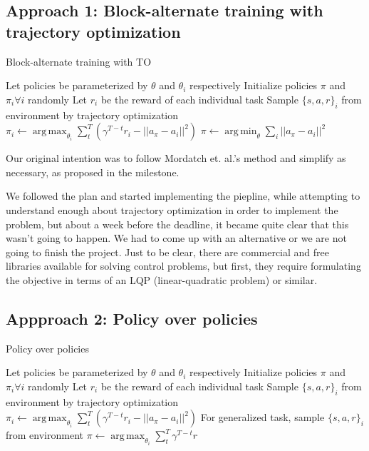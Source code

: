 \documentclass{article}
\DeclareMathOperator*{\argmin}{arg\,min}
\DeclareMathOperator*{\argmax}{arg\,max}
\begin{document}
\subsection{Approach 1: Block-alternate training with trajectory optimization}

\begin{algorithm}[tb]
	\caption{Block-alternate training with TO}
	\begin{algorithmic}
		\STATE Let policies be parameterized by $\theta$ and $\theta_i$ respectively
		\STATE Initialize policies $\pi$ and $\pi_i \forall i$ randomly
			\STATE Let $r_i$ be the reward of each individual task
				\STATE Sample $\{s,a,r\}_i$ from environment by trajectory optimization
				\STATE $\pi_i \leftarrow \argmax_{\theta_i} \sum_{t}^{T} (\gamma^{T-t}r_i - ||a_\pi - a_i||^2) $
			\ENDFOR
			\STATE $\pi \leftarrow \argmin_{\theta} \sum_{i} ||a_\pi - a_i||^2$
		\ENDFOR
	\end{algorithmic}
\end{algorithm}

Our original intention was to follow Mordatch et. al.'s method and simplify as necessary, as proposed in the milestone.

We followed the plan and started implementing the piepline, while attempting to understand enough about trajectory optimization in order to implement the problem, but about a week before the deadline, it became quite clear that this wasn't going to happen. We had to come up with an alternative or we are not going to finish the project. Just to be clear, there are commercial and free libraries available for solving control problems, but first, they require formulating the objective in terms of an LQP (linear-quadratic problem) or similar.

\subsection{Appproach 2: Policy over policies}

\begin{algorithm}[tb]
	\caption{Policy over policies}
	\begin{algorithmic}
		\STATE Let policies be parameterized by $\theta$ and $\theta_i$ respectively
		\STATE Initialize policies $\pi$ and $\pi_i \forall i$ randomly
		\STATE Let $r_i$ be the reward of each individual task
		\FOR{each task $i$}
			\STATE Sample $\{s,a,r\}_i$ from environment by trajectory optimization
			\STATE $\pi_i \leftarrow \argmax_{\theta_i} \sum_{t}^{T} (\gamma^{T-t}r_i - ||a_\pi - a_i||^2) $
		\ENDFOR
		\STATE For generalized task, sample $\{s,a,r\}_i$ from environment
		\STATE $\pi \leftarrow \argmax_{\theta_i} \sum_{t}^{T} \gamma^{T-t}r $
	\end{algorithmic}
\end{algorithm}
\end{document}
